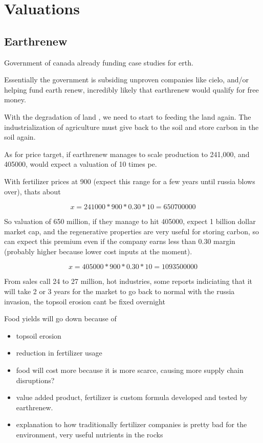 \chapter{Valuations}

\section{Earthrenew}
Government of canada already funding case studies for erth.

Essentially the government is subsiding unproven companies like cielo, and/or helping fund earth renew, incredibly likely that earthrenew would qualify for free money.

With the degradation of land \cite{the_guardian_degraded_2022}, we need to start to feeding the land again. The industrialization of agriculture must give back to the soil and store carbon in the soil again.

As for price target, if earthrenew manages to scale production to 241,000, and 405000, would expect a valuation of 10 times pe.

With fertilizer prices at 900 (expect this range for a few years until russia blows over), thats about 

\begin{equation}
  x = 241000*900*0.30*10 = 650700000
\end{equation}

So valuation of 650 million, if they manage to hit 405000, expect 1 billion dollar market cap, and the regenerative properties are very useful for storing carbon, so can expect this premium even if the company earns less than 0.30 margin (probably higher because lower cost inputs at the moment).

\begin{equation}
  x = 405000*900*0.30*10 = 1093500000
\end{equation}


From sales call 24 to 27 million, hot industries, some reports indiciating that it will take 2 or 3 years for the market to go back to normal with the russia invasion, the topsoil erosion cant be fixed overnight

Food yields will go down because of

\begin{itemize}
    \item topsoil erosion
    \item reduction in fertilizer usage
    \item food will cost more because it is more scarce, causing more supply chain disruptions?
    \item value added product, fertilizer is custom formula developed and tested by earthrenew.
    \item explanation to how traditionally fertilizer companies is pretty bad for the environment, very useful nutrients in the rocks
\end{itemize}

